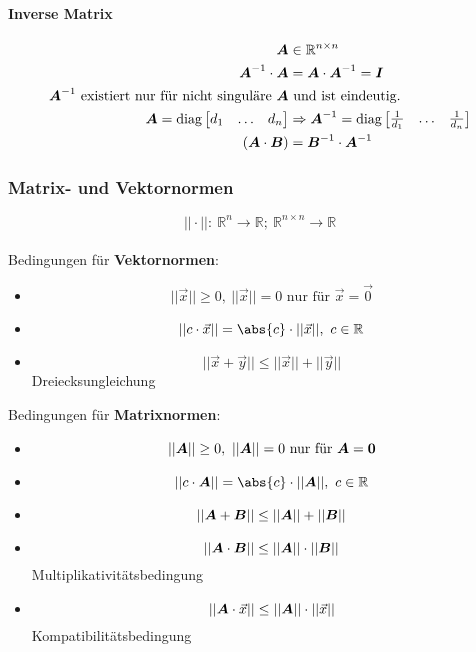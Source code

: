 \paragraph{Inverse Matrix}
\begin{align}
	\boldsymbol {A} &\in \mathbb{R}^{n\times n}\\
	\boldsymbol {A}^{-1} \cdot \boldsymbol {A} &= \boldsymbol {A} \cdot \boldsymbol {A}^{-1} = \boldsymbol {I}\\
	\text{$\boldsymbol {A}^{-1}$ existiert nur für nicht singuläre $\boldsymbol {A}$}&\text{ und ist eindeutig.}\\
	\boldsymbol {A} = \text{diag}\begin{bmatrix}d_1 & \ldots & d_n\end{bmatrix} & \Rightarrow \boldsymbol {A}^{-1} = \text{diag}\begin{bmatrix}\frac{1}{d_1} & \ldots & \frac{1}{d_n}\end{bmatrix}\\
	\left(\boldsymbol {A} \cdot \boldsymbol {B}\right) &= \boldsymbol {B}^{-1} \cdot \boldsymbol {A}^{-1}
\end{align}

\subsubsection{Matrix- und Vektornormen}

\[||\cdot||:\ \mathbb{R}^n \rightarrow \mathbb{R};\ \mathbb{R}^{n\times n} \rightarrow \mathbb{R}\]\\
Bedingungen für \textbf{Vektornormen}:
\begin{itemize}
	\item \[||\vec{x}|| \geq 0,\ ||\vec{x}|| = 0 \text{ nur für } \vec{x} = \vec{0}\]
	\item \[||c \cdot\vec{x}|| = \abs{c} \cdot ||\vec{x}||,\ c \in \mathbb{R}\]
	\item \[||\vec{x} + \vec{y}|| \leq ||\vec{x}|| + ||\vec{y}||\] Dreiecksungleichung
\end{itemize}

Bedingungen für \textbf{Matrixnormen}:
\begin{itemize}
	\item \[||\boldsymbol {A}|| \geq 0,\ ||\boldsymbol {A}|| = 0 \text{ nur für } \boldsymbol {A} = \boldsymbol {0}\]
	\item \[|| c \cdot \ma{A}|| = \abs{c} \cdot ||\ma{A}||,\ c \in \mathbb{R}\]
	\item \[||\boldsymbol {A} + \boldsymbol {B}|| \leq ||\boldsymbol {A}|| + ||\boldsymbol {B}||\]
	\item \[||\boldsymbol {A} \cdot \boldsymbol {B}|| \leq ||\boldsymbol {A}|| \cdot ||\boldsymbol {B}||\] Multiplikativitätsbedingung
	\item \[||\boldsymbol {A} \cdot \vec{x}|| \leq ||\boldsymbol {A}|| \cdot ||\vec{x}||\] Kompatibilitätsbedingung
\end{itemize}

